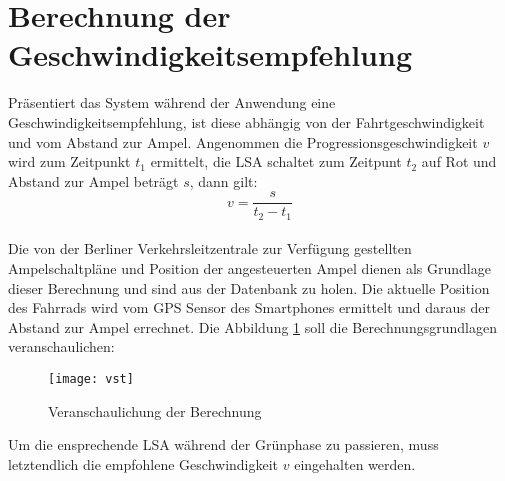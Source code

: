\section{\label{sec:mathGrundlagen}Berechnung der Geschwindigkeitsempfehlung}
Präsentiert das System während der Anwendung eine Geschwindigkeitsempfehlung, ist diese abhängig von der Fahrtgeschwindigkeit und vom Abstand zur Ampel. Angenommen die Progressionsgeschwindigkeit $v$ wird zum Zeitpunkt $t_{1}$ ermittelt, die \gls {LSA} schaltet zum Zeitpunt $t_{2}$ auf Rot und Abstand zur Ampel beträgt $s$, dann gilt: \\
\[ v = \frac{s}{t_{2} - t_{1}} \] \\
Die von der Berliner Verkehrsleitzentrale zur Verfügung gestellten Ampelschaltpläne und Position der angesteuerten Ampel dienen als Grundlage dieser Berechnung und sind aus der Datenbank zu holen. Die aktuelle Position des Fahrrads wird vom \gls{GPS} Sensor des \glspl{Smartphone} ermittelt und daraus der Abstand zur Ampel errechnet. Die Abbildung \ref{fig:vst} soll die Berechnungsgrundlagen veranschaulichen: 
\begin{figure}[H]  
    \centering  
    \texttt{[image: vst]}     
    \caption[Berechnung Progressionsgeschwindigkeit]{Veranschaulichung der Berechnung}
    \label{fig:vst}
\end{figure}
Um die ensprechende \gls{LSA} während der Grünphase zu passieren, muss letztendlich die empfohlene Geschwindigkeit $v$ eingehalten werden.
